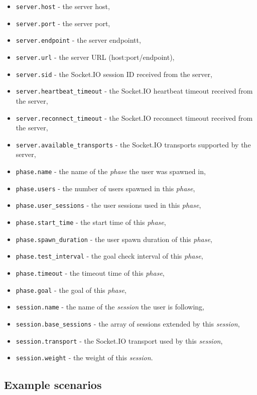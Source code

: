 \documentclass[a4paper]{article}
\begin{document}
\begin{itemize}
\item \texttt{server.host} - the server host,
\item \texttt{server.port} - the server port,
\item \texttt{server.endpoint} - the server endpointt,
\item \texttt{server.url} - the server URL (host:port/endpoint),
\item \texttt{server.sid} - the Socket.IO session ID received from the server,
\item \texttt{server.heartbeat\_timeout} - the Socket.IO heartbeat timeout received from the server,
\item \texttt{server.reconnect\_timeout} - the Socket.IO reconnect timeout received from the server,
\item \texttt{server.available\_transports} - the Socket.IO transports supported by the server,
\item \texttt{phase.name} - the name of the \emph{phase} the user was spawned in,
\item \texttt{phase.users} - the number of users spawned in this \emph{phase},
\item \texttt{phase.user\_sessions} - the user sessions used in this \emph{phase},
\item \texttt{phase.start\_time} - the start time of this \emph{phase},
\item \texttt{phase.spawn\_duration} - the user spawn duration of this \emph{phase},
\item \texttt{phase.test\_interval} - the goal check interval of this \emph{phase},
\item \texttt{phase.timeout} - the timeout time of this \emph{phase},
\item \texttt{phase.goal} - the goal of this \emph{phase},
\item \texttt{session.name} - the name of the \emph{session} the user is following,
\item \texttt{session.base\_sessions} - the array of sessions extended by this \emph{session},
\item \texttt{session.transport} - the Socket.IO transport used by this \emph{session},
\item \texttt{session.weight} - the weight of this \emph{session}.
\end{itemize}
\subsection{Example scenarios}
\label{sec-3-7}
\label{ref-example_scenarios}
\end{document}
